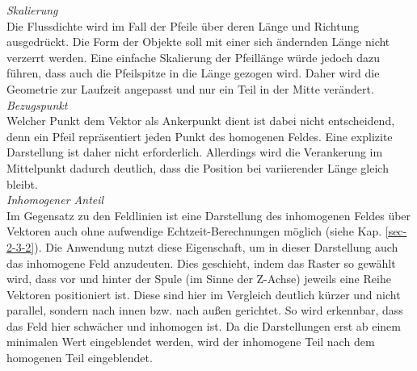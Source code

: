 \textit{Skalierung}\\
Die Flussdichte wird im Fall der Pfeile über deren Länge und Richtung ausgedrückt. Die Form der Objekte soll mit einer sich ändernden Länge nicht verzerrt werden. Eine einfache Skalierung der Pfeillänge würde jedoch dazu führen, dass auch die Pfeilspitze in die Länge gezogen wird. Daher wird die Geometrie zur Laufzeit angepasst und nur ein Teil in der Mitte verändert.\\

\textit{Bezugspunkt}\\
Welcher Punkt dem Vektor als Ankerpunkt dient ist dabei nicht entscheidend, denn ein Pfeil repräsentiert jeden Punkt des homogenen Feldes. Eine explizite Darstellung ist daher nicht erforderlich. Allerdings wird die Verankerung im Mittelpunkt dadurch deutlich, dass die Position bei variierender Länge gleich bleibt.\\

\textit{Inhomogener Anteil}\\
Im Gegensatz zu den Feldlinien ist eine Darstellung des inhomogenen Feldes über Vektoren auch ohne aufwendige Echtzeit-Berechnungen möglich (siehe Kap. \ref{sec-2-3-2}). Die Anwendung nutzt diese Eigenschaft, um in dieser Darstellung auch das inhomogene Feld anzudeuten. Dies geschieht, indem das Raster so gewählt wird, dass vor und hinter der Spule (im Sinne der Z-Achse) jeweils eine Reihe Vektoren positioniert ist. Diese sind hier im Vergleich deutlich kürzer und nicht parallel, sondern nach innen bzw. nach außen gerichtet. So wird erkennbar, dass das Feld hier schwächer und inhomogen ist. Da die Darstellungen erst ab einem minimalen Wert eingeblendet werden, wird der inhomogene Teil nach dem homogenen Teil eingeblendet.\\

\vspace{4px}
\begin{center}
	\\
\end{center}
\vspace{6px}

